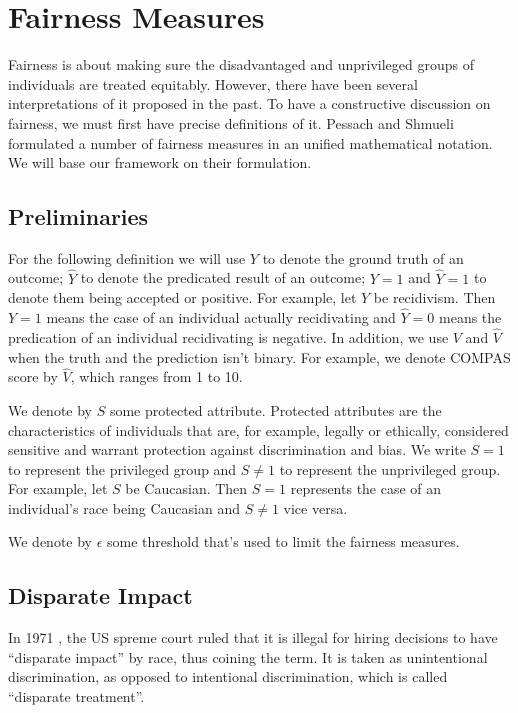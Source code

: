 \documentclass[conference]{IEEEtran}
\begin{document}
\section{Fairness Measures}
\label{sec:measures}
Fairness is about making sure the disadvantaged and unprivileged groups of individuals are treated equitably. However, there have been several interpretations of it proposed in the past. To have a constructive discussion on fairness, we must first have precise definitions of it. Pessach and Shmueli \cite{pessach2022review} formulated a number of fairness measures in an unified mathematical notation. We will base our framework on their formulation.

\subsection{Preliminaries}
For the following definition we will use $Y$ to denote the ground truth of an outcome; $\hat{Y}$ to denote the predicated result of an outcome; $Y = 1$ and $\hat{Y} = 1$ to denote them being accepted or positive. For example, let $Y$ be recidivism. Then $Y = 1$ means the case of an individual actually recidivating and $\hat{Y} = 0$ means the predication of an individual recidivating is negative. In addition, we use $V$ and $\hat{V}$ when the truth and the prediction isn't binary. For example, we denote COMPAS score by $\hat{V}$, which ranges from 1 to 10.

We denote by $S$ some protected attribute. Protected attributes are the characteristics of individuals that are, for example, legally or ethically, considered sensitive and warrant protection against discrimination and bias. We write $S = 1$ to represent the privileged group and $S \neq 1$ to represent the unprivileged group. For example, let $S$ be Caucasian. Then $S = 1$ represents the case of an individual's race being Caucasian and $S \neq 1$ vice versa.

We denote by $\epsilon$ some threshold that's used to limit the fairness measures.

\subsection{Disparate Impact}
In 1971 \cite{griggs1971}, the US spreme court ruled that it is illegal for hiring decisions to have  ``disparate impact'' by race, thus coining the term. It is taken as unintentional discrimination, as opposed to intentional discrimination, which is called ``disparate treatment''.
\end{document}
